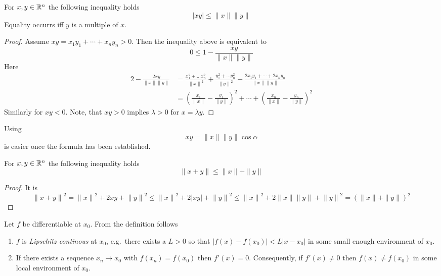 \begin{lemma}\label{thm:cauchy_schwarz_inequality}
    For \( x, y \in \mathbb{R}^n \) the following inequality holds
    \[
        |xy| \le \|x\| \|y\|
    \]
    Equality occurrs iff \( y \) is a multiple of \( x \).
\end{lemma}
\begin{proof}
    Assume \( xy = x_1 y_1 + \cdots + x_n y_n > 0 \). Then the inequality above is equivalent to
    \[ 0 \le 1 - \frac{xy}{\|x\| \|y\|} \]
    Here
    \[
        \begin{split}
            2 - \frac{2xy}{\|x\| \|y\|}
            & = \frac{x_1^2 + \dots x_n^2}{{\|x\|}^2} +
            \frac{y_1^2 + \dots y_n^2}{{\|y\|}^2} - \frac{2x_1 y_1 + \cdots + 2x_n y_n}{\|x\| \|y\|} \\
            & = {\left( \frac{x_1}{\|x\|} - \frac{y_1}{\|y\|} \right)}^2 + \cdots +
            {\left( \frac{x_n}{\|x\|} - \frac{y_n}{\|y\|} \right)}^2
        \end{split}
    \]
    Similarly for \( xy < 0 \). Note, that \( xy > 0 \) implies \( \lambda > 0 \) for \( x = \lambda y\). 
\end{proof}
\bigskip

\begin{remark}
    Using
    \[
        xy = \|x\| \|y\| \cos\alpha
    \]
    is easier once the formula has been established.
\end{remark}
\bigskip


\begin{lemma}\label{thm:triangle_inequality}
    For \( x, y \in \mathbb{R}^n \) the following inequality holds
    \[
        \|x + y\| \le \|x\| + \|y\|
    \]
\end{lemma}
\begin{proof}
    It is
    \[
        {\|x + y\|}^2 = {\|x\|}^2 + 2xy + {\|y\|}^2 \le {\|x\|}^2 + 2|xy| + {\|y\|}^2
        \le {\|x\|}^2 + 2\|x\| \|y\| + {\|y\|}^2 = {(\|x\| + \|y\|)}^2
    \]
\end{proof}
\bigskip


\begin{remarks}Let \( f \) be differentiable at \( x_0 \). From the definition follows
    \begin{enumerate}
        \item \( f \) is \emph{Lipschitz continous} at \( x_0 \), e.g.\ there exists a \( L > 0 \) so that
              \( |f(x) - f(x_0)| < L|x - x_0| \) in some small enough environment of \( x_0 \).
        \item If there exists a sequence  \( x_n \to x_0 \) with \( f(x_n) = f(x_0) \) then \( f'(x) = 0 \).
              Consequently, if \( f'(x) \ne 0 \) then \( f(x) \ne f(x_0) \) in some local environment of \( x_0 \).
    \end{enumerate}
\end{remarks}
\bigskip

